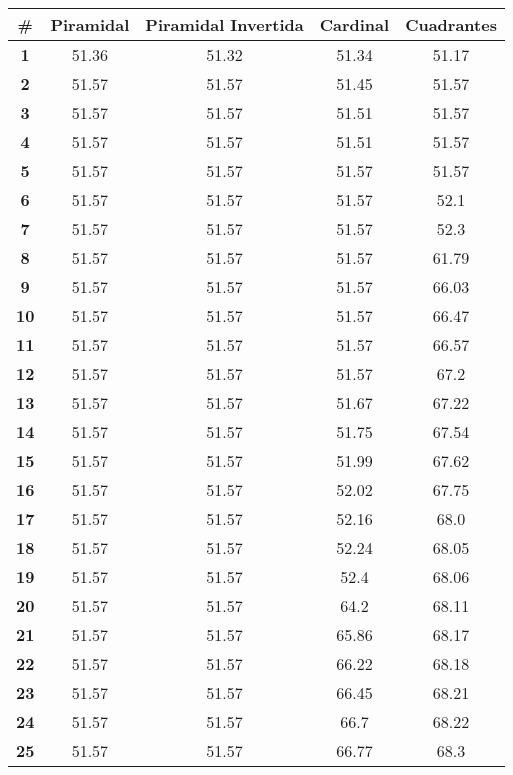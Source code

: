 \begin{longtable}{|c|c|c|c|c|}
    \hline
    \rowcolor[HTML]{ECF4FF} 
    \textbf{\#} & \textbf{Piramidal} & \textbf{Piramidal Invertida} & \textbf{Cardinal} & \textbf{Cuadrantes} \\ \hline
    \endhead
    \textbf{1} & 51.36 & 51.32 & 51.34 & 51.17 \\ \hline 
\textbf{2} & 51.57 & 51.57 & 51.45 & 51.57 \\ \hline 
\textbf{3} & 51.57 & 51.57 & 51.51 & 51.57 \\ \hline 
\textbf{4} & 51.57 & 51.57 & 51.51 & 51.57 \\ \hline 
\textbf{5} & 51.57 & 51.57 & 51.57 & 51.57 \\ \hline 
\textbf{6} & 51.57 & 51.57 & 51.57 & 52.1 \\ \hline 
\textbf{7} & 51.57 & 51.57 & 51.57 & 52.3 \\ \hline 
\textbf{8} & 51.57 & 51.57 & 51.57 & 61.79 \\ \hline 
\textbf{9} & 51.57 & 51.57 & 51.57 & 66.03 \\ \hline 
\textbf{10} & 51.57 & 51.57 & 51.57 & 66.47 \\ \hline 
\textbf{11} & 51.57 & 51.57 & 51.57 & 66.57 \\ \hline 
\textbf{12} & 51.57 & 51.57 & 51.57 & 67.2 \\ \hline 
\textbf{13} & 51.57 & 51.57 & 51.67 & 67.22 \\ \hline 
\textbf{14} & 51.57 & 51.57 & 51.75 & 67.54 \\ \hline 
\textbf{15} & 51.57 & 51.57 & 51.99 & 67.62 \\ \hline 
\textbf{16} & 51.57 & 51.57 & 52.02 & 67.75 \\ \hline 
\textbf{17} & 51.57 & 51.57 & 52.16 & 68.0 \\ \hline 
\textbf{18} & 51.57 & 51.57 & 52.24 & 68.05 \\ \hline 
\textbf{19} & 51.57 & 51.57 & 52.4 & 68.06 \\ \hline 
\textbf{20} & 51.57 & 51.57 & 64.2 & 68.11 \\ \hline 
\textbf{21} & 51.57 & 51.57 & 65.86 & 68.17 \\ \hline 
\textbf{22} & 51.57 & 51.57 & 66.22 & 68.18 \\ \hline 
\textbf{23} & 51.57 & 51.57 & 66.45 & 68.21 \\ \hline 
\textbf{24} & 51.57 & 51.57 & 66.7 & 68.22 \\ \hline 
\textbf{25} & 51.57 & 51.57 & 66.77 & 68.3 \\ \hline 

\end{longtable}
